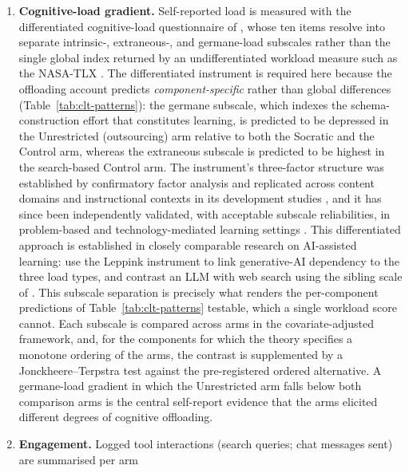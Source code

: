 \begin{enumerate}
    \item \textbf{Cognitive-load gradient.} Self-reported load is measured with the differentiated cognitive-load questionnaire of \textcite{leppink2013},
    whose ten items resolve into separate intrinsic-, extraneous-, and germane-load subscales rather than the single global index returned by an undifferentiated workload measure such as the NASA-TLX \parencite{hart1988}. %
    The differentiated instrument is required here because the offloading account predicts \emph{component-specific} rather than global differences (Table~\ref{tab:clt-patterns}): the germane subscale, which indexes the schema-construction effort that constitutes learning, is predicted to be depressed in the Unrestricted (outsourcing) arm relative to both the Socratic and the Control arm, whereas the extraneous subscale is predicted to be highest in the search-based Control arm.
    The instrument's three-factor structure was established by confirmatory factor analysis and replicated across content domains and instructional contexts in its development studies \parencite{leppink2013,leppink2014}, and it has since been independently validated, with acceptable subscale reliabilities, in problem-based and technology-mediated learning settings \parencite{hadie2016,andersen2021}. This differentiated approach is established in closely comparable research on AI-assisted learning: \textcite{zhang2026} use the Leppink instrument to link generative-AI dependency to the three load types, and \textcite{stadler2024} contrast an LLM with web search using the sibling scale of \textcite{klepsch2017}. This subscale separation is precisely what renders the per-component predictions of Table~\ref{tab:clt-patterns} testable, which a single workload score cannot. Each subscale is compared across arms in the covariate-adjusted framework, and, for the components for which the theory specifies a monotone ordering of the arms, the contrast is supplemented by a Jonckheere--Terpstra test \parencite{jonckheere1954} %
    against the pre-registered ordered alternative. A germane-load gradient in which the Unrestricted arm falls below both comparison arms is the central self-report evidence that the arms elicited different degrees of cognitive offloading.
    \item \textbf{Engagement.} Logged tool interactions (search queries; chat messages sent) are summarised per arm

\end{enumerate}
